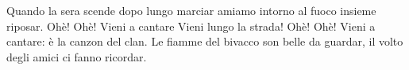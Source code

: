 \chordsoff
\beginverse
Quando la sera scende dopo lungo marciar
amiamo intorno al fuoco insieme riposar. 
\endverse
\beginchorus
Ohè! Ohè! Vieni a cantare
Vieni lungo la strada! Ohè! Ohè!
Vieni a cantare: è la canzon del clan. 
\endchorus
\beginverse
Le fiamme del bivacco son belle da guardar, 
il volto degli amici ci fanno ricordar. 
\endverse
\endsong

